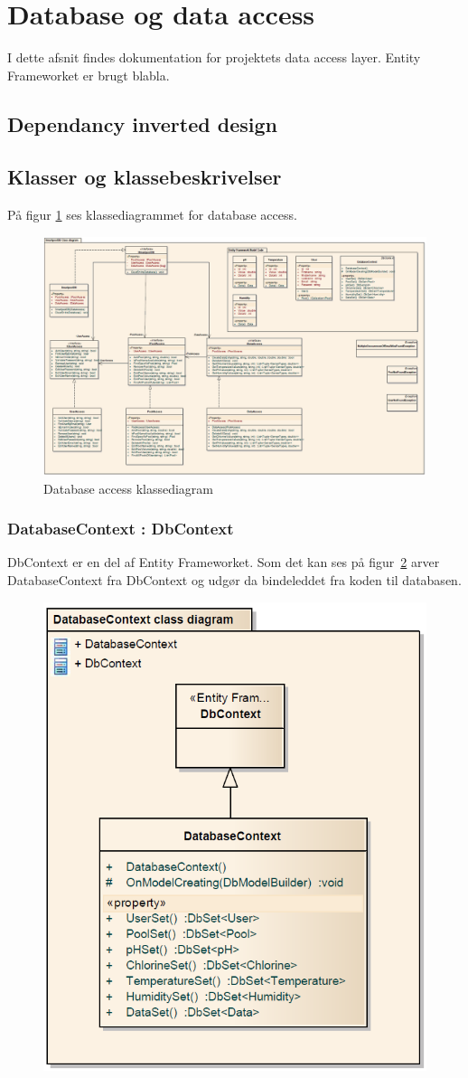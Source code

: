 \section{Database og data access}
I dette afsnit findes dokumentation for projektets data access layer. Entity Frameworket er brugt blabla.

\subsection{Dependancy inverted design}


\subsection{Klasser og klassebeskrivelser}
På figur \ref{fig:databaseFullClass} ses klassediagrammet for database access. 

\begin{landscape}
\begin{figure}[h]
\centering
\includegraphics[width=\linewidth]{figs/implementering/databaseFullClass.PNG}
\caption{Database access klassediagram}
\label{fig:databaseFullClass}
\end{figure}
\end{landscape}


\subsubsection{DatabaseContext : DbContext}
DbContext er en del af Entity Frameworket. Som det kan ses på figur~\ref{fig:dbContextClass} arver DatabaseContext fra DbContext \cite{microsoftdbcontext} og udgør da bindeleddet fra koden til databasen.

\begin{figure}
\centering
\includegraphics[width=0.3\linewidth]{figs/implementering/dbContextClass.PNG}
\caption{}
\label{fig:dbContextClass}
\end{figure}

